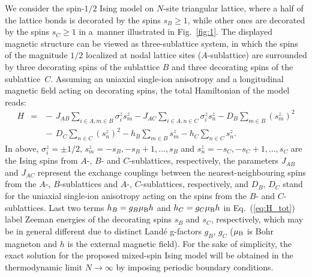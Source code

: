 \documentclass[final,5p,times,sort&compress]{elsarticle}
\begin{document}
We consider the spin-$1/2$ Ising model on $N$-site triangular lattice, where a half of the lattice bonds is decorated by the spins $s_{B}\geq1$, while other ones are decorated by the spins $s_{C}\geq1$ in a~manner illustrated in Fig.~\ref{fig:1}. The displayed magnetic structure can be viewed as three-sublattice system, in which the spins of the magnitude $1/2$ localized at nodal lattice sites ($A$-sublattice) are surrounded by three decorating spins of the sublattice $B$ and three decorating spins of the sublattice~$C$. Assuming an uniaxial single-ion anisotropy and a longitudinal magnetic field acting on decorating spins, the total Hamiltonian of the model reads:
\begin{eqnarray}
\label{eq:H_tot}
H\!\!\!&=&\!\!\! -\,J_{AB}\!\!\!{\sum_{i\in A,m\in B}}\!\!\sigma_{i}^{z}s_{m}^{z} - J_{AC}\!\!\!{\sum_{i\in A,n\in C }}\!\!\sigma_{i}^{z}s_{n}^{z}
- D_{B}\!\sum_{m\in B}\left(s_{m}^{z}\right)^{2}
\nonumber\\
\!\!\!& &\!\!\!-\, D_{C}\!\sum_{n\in C}\left(s_{n}^{z}\right)^{2}
- h_B\!\sum_{m \in B}s_{m}^{z}
- h_C\!\sum_{n \in C}s_{n}^{z}.
\end{eqnarray}
In above, $\sigma_{i}^{z}=\pm1/2$, $s_{m}^{z} = -s_{B}, -s_{B}+1,\ldots,s_{B}$ and $s_{n}^{z} = -s_{C}, -s_{C}+1,\ldots,s_{C}$ are the Ising spins from $A$-, $B$- and $C$-sublattices, respectively, the parameters $J_{AB}$ and $J_{AC}$ represent the exchange couplings between the nearest-neighbouring spins from the $A$-, $B$-sublattices and $A$-, $C$-sublattices, respectively, and $D_{B}$, $D_{C}$ stand for the uniaxial single-ion anisotropy acting on the spins from the $B$- and $C$-sublattices. Last two terms $h_B = g_B\mu_{\rm B}h$ and $h_C = g_C\mu_{\rm B}h$ in Eq.~(\ref{eq:H_tot}) label Zeeman energies of the decorating spins $s_{B}$ and $s_{C}$, respectively, which may be in general different due to distinct Land\'e g-factors $g_B$, $g_C$ ($\mu_{\rm B}$ is Bohr magneton and $h$ is the external magnetic field).
For the sake of simplicity, the exact solution for the proposed mixed-spin Ising model will be obtained in the thermodynamic limit $N \to \infty$ by imposing periodic boundary conditions.
\end{document}
